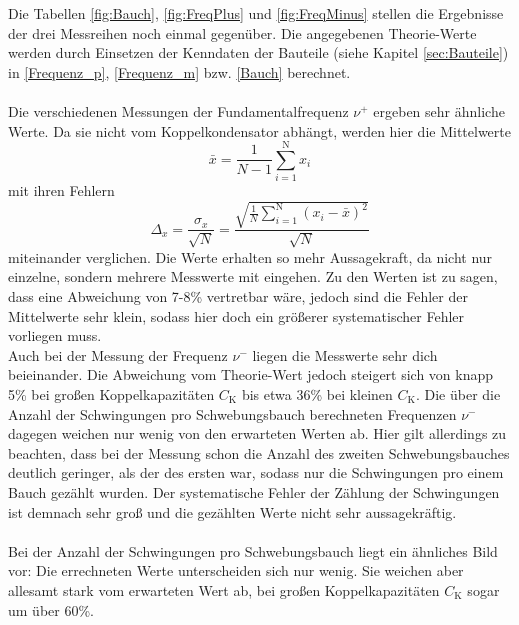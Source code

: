 Die Tabellen \ref{fig:Bauch}, \ref{fig:FreqPlus} und \ref{fig:FreqMinus} stellen die Ergebnisse der drei Messreihen noch einmal gegenüber. Die angegebenen Theorie-Werte werden durch Einsetzen der Kenndaten der Bauteile (siehe Kapitel \ref{sec:Bauteile}) in \eqref{Frequenz_p}, \eqref{Frequenz_m} bzw. \eqref{Bauch} berechnet. \\
\ \\
Die verschiedenen Messungen der Fundamentalfrequenz $\nu^+$ ergeben sehr ähnliche Werte. Da sie nicht vom Koppelkondensator abhängt, werden hier die Mittelwerte
\[ \bar{x} = \frac{1}{N-1} \sum_{i=1}^\text{N} x_i \]
mit ihren Fehlern
\[ \Delta_{x} = \frac{\sigma_x}{\sqrt{N}} = \frac{\sqrt{\frac{1}{N} \sum_{i=1}^\text{N} (x_i - \bar{x})^2}}{\sqrt{N}} \]
miteinander verglichen. Die Werte erhalten so mehr Aussagekraft, da nicht nur einzelne, sondern mehrere Messwerte mit eingehen. Zu den Werten ist zu sagen, dass eine Abweichung von 7-8\% vertretbar wäre, jedoch sind die Fehler der Mittelwerte sehr klein, sodass hier doch ein größerer systematischer Fehler vorliegen muss.
 \\
Auch bei der Messung der Frequenz $\nu^-$ liegen die Messwerte sehr dich beieinander. Die Abweichung vom Theorie-Wert jedoch steigert sich von knapp 5\% bei großen Koppelkapazitäten $C_\text{K}$ bis etwa 36\% bei kleinen $C_\text{K}$. Die über die Anzahl der Schwingungen pro Schwebungsbauch berechneten Frequenzen $\nu^-$ dagegen weichen nur wenig von den erwarteten Werten ab. Hier gilt allerdings zu beachten, dass bei der Messung schon die Anzahl des zweiten Schwebungsbauches deutlich geringer, als der des ersten war, sodass nur die Schwingungen pro einem Bauch gezählt wurden. Der systematische Fehler der Zählung der Schwingungen ist demnach sehr groß und die gezählten Werte nicht sehr aussagekräftig. \\
 \\
Bei der Anzahl der Schwingungen pro Schwebungsbauch liegt ein ähnliches Bild vor: Die errechneten Werte unterscheiden sich nur wenig. Sie weichen aber allesamt stark vom erwarteten Wert ab, bei großen Koppelkapazitäten $C_\text{K}$ sogar um über 60\%.

